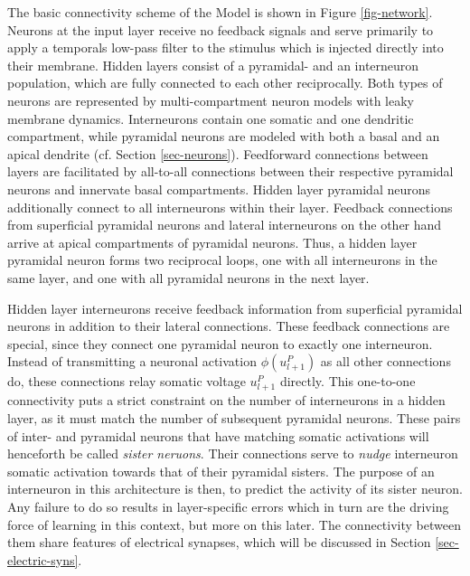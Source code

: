 
The basic connectivity scheme of the Model is shown in Figure \ref{fig-network}. Neurons at the input layer receive no
feedback signals and serve primarily to apply a temporals low-pass filter to the stimulus which is injected directly
into their membrane.  Hidden layers consist of a pyramidal- and an interneuron population, which are fully connected to
each other reciprocally. Both types of neurons are represented by multi-compartment neuron models with leaky membrane
dynamics. Interneurons contain one somatic and one dendritic compartment, while pyramidal neurons are modeled with both
a basal and an apical dendrite (cf. Section \ref{sec-neurons}).  Feedforward connections between layers are facilitated
by all-to-all connections between their respective pyramidal neurons and innervate basal compartments. Hidden layer
pyramidal neurons additionally connect to all interneurons within their layer. Feedback connections from superficial
pyramidal neurons and lateral interneurons on the other hand arrive at apical compartments of pyramidal neurons. Thus, a
hidden layer pyramidal neuron forms two reciprocal loops, one with all interneurons in the same layer, and one with all
pyramidal neurons in the next layer.

Hidden layer interneurons receive feedback information from superficial pyramidal neurons in addition to their lateral
connections. These feedback connections are special, since they connect one pyramidal neuron to exactly one interneuron.
Instead of transmitting a neuronal activation $\phi(u_{l+1}^P)$ as all other connections do, these connections relay
somatic voltage $u_{l+1}^P$ directly. This one-to-one connectivity puts a strict constraint on the number of
interneurons in a hidden layer, as it must match the number of subsequent pyramidal neurons. These pairs of inter- and
pyramidal neurons that have matching somatic activations will henceforth be called \textit{sister neruons}. Their
connections serve to \textit{nudge} interneuron somatic activation towards that of their pyramidal sisters. The purpose
of an interneuron in this architecture is then, to predict the activity of its sister neuron. Any failure to do so
results in layer-specific errors which in turn are the driving force of learning in this context, but more on this
later.  The connectivity between them share features of electrical synapses, which will be discussed in Section
\ref{sec-electric-syns}. 


